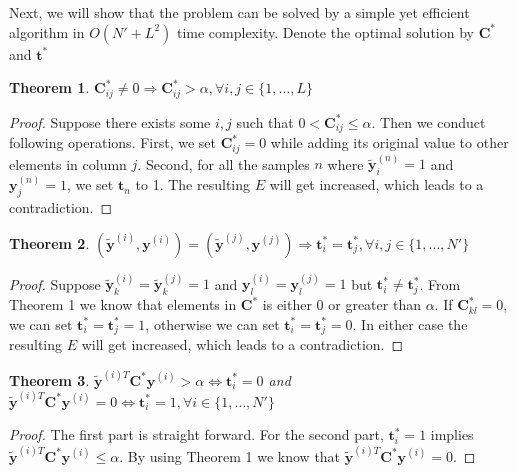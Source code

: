 \documentclass[10pt,twocolumn,letterpaper]{article}
\def\vec{\mathbf}
\def\mat{\mathbf}
\newtheorem{theorem}{Theorem}
\begin{document}
Next, we will show that the problem can be solved by a simple yet efficient algorithm in $O(N'+L^2)$ time complexity. Denote the optimal solution by $\mat{C}^*$ and $\vec{t}^*$
\begin{theorem}
$\mat{C}^*_{ij} \neq 0 \Rightarrow \mat{C}^*_{ij} > \alpha, \forall i,j \in \{1,\dots,L\}$
\end{theorem}
\begin{proof}
Suppose there exists some $i,j$ such that $0 < \mat{C}^*_{ij} \leq \alpha$. Then we conduct following operations. First, we set $\mat{C}^*_{ij}=0$ while adding its original value to other elements in column $j$. Second, for all the samples $n$ where $\tilde{\vec{y}}^{(n)}_i=1$ and $\vec{y}^{(n)}_j=1$, we set $\vec{t}_n$ to 1. The resulting $E$ will get increased, which leads to a contradiction.
\end{proof}
\begin{theorem}
$(\tilde{\vec{y}}^{(i)},\vec{y}^{(i)})=(\tilde{\vec{y}}^{(j)},\vec{y}^{(j)}) \Rightarrow \vec{t}^*_i=\vec{t}^*_j, \forall i,j \in \{1,\dots,N'\}$
\end{theorem}
\begin{proof}
Suppose $\tilde{\vec{y}}^{(i)}_k=\tilde{\vec{y}}^{(j)}_k=1$ and $\vec{y}^{(i)}_l=\vec{y}^{(j)}_l=1$ but $\vec{t}^*_i \neq \vec{t}^*_j$. From Theorem 1 we know that elements in $\mat{C}^*$ is either 0 or greater than $\alpha$. If $\mat{C}^*_{kl}=0$, we can set $\vec{t}^*_i=\vec{t}^*_j=1$, otherwise we can set $\vec{t}^*_i=\vec{t}^*_j=0$. In either case the resulting $E$ will get increased, which leads to a contradiction.
\end{proof}
\begin{theorem}
$\tilde{\vec{y}}^{(i)T} \mat{C}^* \vec{y}^{(i)} > \alpha \Leftrightarrow \vec{t}^*_i=0$ and $\tilde{\vec{y}}^{(i)T} \mat{C}^* \vec{y}^{(i)} = 0 \Leftrightarrow \vec{t}^*_i=1, \forall i \in \{1,\dots,N'\}$
\end{theorem}
\begin{proof}
The first part is straight forward. For the second part, $\vec{t}^*_i=1$ implies $\tilde{\vec{y}}^{(i)T} \mat{C}^* \vec{y}^{(i)} \leq \alpha$. By using Theorem 1 we know that $\tilde{\vec{y}}^{(i)T} \mat{C}^* \vec{y}^{(i)} = 0$.
\end{proof}
\end{document}
